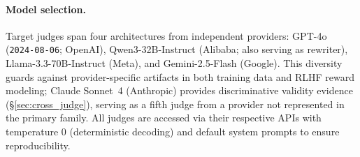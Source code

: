 \paragraph{Model selection.}
Target judges span four architectures from independent providers: GPT-4o (\texttt{2024-08-06}; OpenAI), Qwen3-32B-Instruct (Alibaba; also serving as rewriter), Llama-3.3-70B-Instruct (Meta), and Gemini-2.5-Flash (Google).
This diversity guards against provider-specific artifacts in both training data and RLHF reward modeling; Claude Sonnet~4 (Anthropic) provides discriminative validity evidence (\S\ref{sec:cross_judge}), serving as a fifth judge from a provider not represented in the primary family.
All judges are accessed via their respective APIs with temperature 0 (deterministic decoding) and default system prompts to ensure reproducibility.

